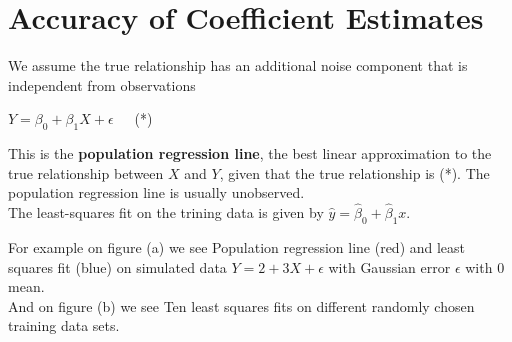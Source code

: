 	
	\section{Accuracy of Coefficient Estimates}
		We assume the true relationship has an additional noise component that is independent from observations
		\begin{center}
			$Y = \beta_0 + \beta_1X + \epsilon$\ \ \ (*)
		\end{center}
		This is the \textbf{population regression line}, the best linear approximation to the true relationship between $X$ and $Y$, given that the true relationship is (*).
		The population regression line is usually unobserved.\\
		The least-squares fit on the trining data is given by $\hat{y} = \hat{\beta}_0 + \hat{\beta}_1x$.
		\begin{figure}[ht]
		  \centering
		  \qquad
		\end{figure}
		For example on figure (a) we see Population regression line (red) and least squares fit (blue) on simulated data $𝑌=2+3𝑋+\epsilon$ with Gaussian error $\epsilon$ with $0$ mean.\\
		And on figure (b) we see Ten least squares fits on different randomly chosen training data sets.
	
	
